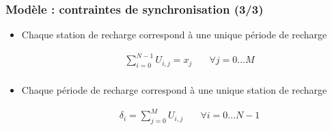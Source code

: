 \documentclass[hyperref={bookmarks=false},aspectratio=169]{beamer}
\begin{document}
\begin{frame}
	
\frametitle{ Modèle : contraintes de synchronisation (3/3)}
\begin{itemize}
  \item Chaque station de recharge correspond à une unique période de recharge

 \small{
	\begin{equation}
		\begin{array}{lll}
		
		 &\sum_{i=0}^{N-1}U_{i,j} = x_j &\quad \forall j = 0 \dots M\\
		
		  
			\end{array}
	\end{equation}
}
\item Chaque période de recharge correspond à une unique station de recharge

 \small{
	\begin{equation}
		\begin{array}{lll}
		
		& \delta_i = \sum_{j=0}^{M}U_{i,j}& \quad \forall i = 0 \dots N-1\\
		
		  
			\end{array}
	\end{equation}
}

	\end{itemize}

 \pause


\end{frame}
\end{document}
